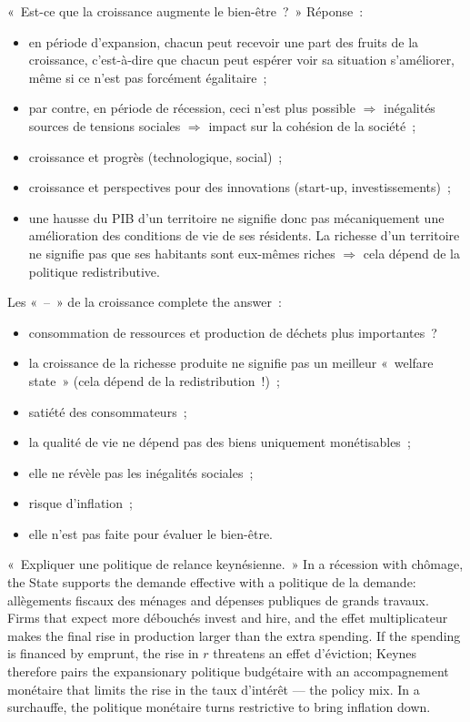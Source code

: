 \begin{example}
  «~Est-ce que la croissance augmente le bien-être~?~» Réponse~:
  \begin{itemize}
    \item en période d'expansion, chacun peut recevoir une part des fruits de la
      croissance, c'est-à-dire que chacun peut espérer voir sa situation
      s'améliorer, même si ce n'est pas forcément égalitaire~;
    \item par contre, en période de récession, ceci n'est plus possible
      $\Rightarrow$ inégalités sources de tensions sociales $\Rightarrow$ impact
      sur la cohésion de la société~;
    \item croissance et progrès (technologique, social)~;
    \item croissance et perspectives pour des innovations (start-up,
      investissements)~;
    \item une hausse du PIB d'un territoire ne signifie donc pas mécaniquement une
      amélioration des conditions de vie de ses résidents. La richesse d'un
      territoire ne signifie pas que ses habitants sont eux-mêmes riches
      $\Rightarrow$ cela dépend de la politique redistributive.
  \end{itemize}
  Les «~--~» de la croissance complete the answer~:
  \begin{itemize}
    \item consommation de ressources et production de déchets plus
      importantes~?
    \item la croissance de la richesse produite ne signifie pas un meilleur
      «~welfare state~» (cela dépend de la redistribution~!)~;
    \item satiété des consommateurs~;
    \item la qualité de vie ne dépend pas des biens uniquement monétisables~;
    \item elle ne révèle pas les inégalités sociales~;
    \item risque d'inflation~;
    \item elle n'est pas faite pour évaluer le bien-être.
  \end{itemize}
\end{example}

\begin{example}
  «~Expliquer une politique de relance keynésienne.~» In a récession with
  chômage, the State supports the demande effective with a politique de la
  demande: allègements fiscaux des ménages and dépenses publiques de grands
  travaux. Firms that expect more débouchés invest and hire, and the effet
  multiplicateur makes the final rise in production larger than the extra
  spending. If the spending is financed by emprunt, the rise in $r$ threatens an
  effet d'éviction; Keynes therefore pairs the expansionary politique budgétaire
  with an accompagnement monétaire that limits the rise in the taux d'intérêt
  --- the policy mix. In a surchauffe, the politique monétaire turns
  restrictive to bring inflation down.
\end{example}

